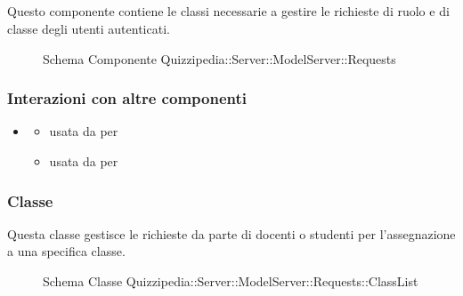 \subsection{}
Questo componente contiene le classi necessarie a gestire le richieste di ruolo e di classe degli utenti autenticati.
\begin{figure}[H]
\centering
\noindent{}
\caption[Schema Componente Quizzipedia::Server::ModelServer::Requests]{Schema Componente Quizzipedia::Server::ModelServer::Requests}
\end{figure}
\subsubsection{Interazioni con altre componenti}
\begin{itemize}
\item {}
\begin{itemize}
\item usata da  per 
\item usata da  per 
\end{itemize}
\end{itemize}
\subsubsection{Classe }
Questa classe gestisce le richieste da parte di docenti o studenti per l'assegnazione a una specifica classe.
\begin{figure}[H]
\centering
\noindent{}
\caption[Schema Classe ClassList]{Schema Classe Quizzipedia::Server::ModelServer::Requests::ClassList}
\end{figure}
